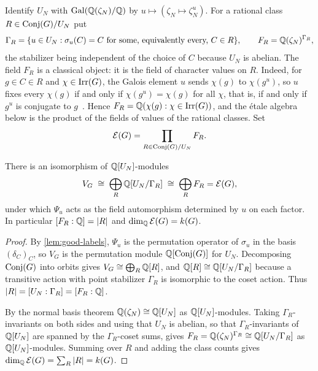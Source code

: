Identify \(U_N\) with \(\operatorname{Gal}(\mathbb Q(\zeta_N)/\mathbb Q)\) by
\(u\mapsto(\zeta_N\mapsto\zeta_N^u)\).  For a rational class
\(R\in\operatorname{Conj}(G)/U_N\) put
\[
 \Gamma_R=\{u\in U_N:\sigma_u(C)=C\ \text{for some, equivalently every, }C\in R\},
 \qquad
 F_R=\Q(\zeta_N)^{\Gamma_R},
\]
the stabilizer being independent of the choice of \(C\) because \(U_N\) is
abelian.  The field \(F_R\) is a classical object: it is the field of
character values on \(R\).  Indeed, for \(g\in C\in R\) and
\(\chi\in\operatorname{Irr}(G)\), the Galois element \(u\) sends \(\chi(g)\) to
\(\chi(g^u)\), so \(u\) fixes every \(\chi(g)\) if and only if
\(\chi(g^u)=\chi(g)\) for all \(\chi\), that is, if and only if
\(g^u\) is conjugate to \(g\)~\cite{Isaacs}.  Hence
\(F_R=\mathbb Q(\chi(g):\chi\in\operatorname{Irr}(G))\), and the étale algebra below is the
product of the fields of values of the rational classes.  Set
\begin{equation}
 \mathcal E(G)=\prod_{R\in\operatorname{Conj}(G)/U_N}F_R .
 \label{eq:etale-algebra}
\end{equation}

\begin{theorem}
\label{thm:rational-class-decomposition}
There is an isomorphism of \(\mathbb Q[U_N]\)-modules
\begin{equation}
 V_G\;\cong\;\bigoplus_R\mathbb Q[U_N/\Gamma_R]\;\cong\;\bigoplus_RF_R=\mathcal E(G),
 \label{eq:etale-decomposition}
\end{equation}
under which \(\Psi_u\) acts as the field automorphism determined by \(u\) on
each factor.  In particular \([F_R:\mathbb Q]=|R|\) and
\(\dim_\mathbb Q\mathcal E(G)=k(G)\).
\end{theorem}

\begin{proof}
By \cref{lem:good-labels}, \(\Psi_u\) is the permutation operator of
\(\sigma_u\) in the basis \((\delta_C)_C\), so \(V_G\) is the permutation
module \(\mathbb Q[\operatorname{Conj}(G)]\) for \(U_N\).  Decomposing \(\operatorname{Conj}(G)\) into orbits
gives \(V_G\cong\bigoplus_R\mathbb Q[R]\), and \(\mathbb Q[R]\cong\mathbb Q[U_N/\Gamma_R]\) because
a transitive action with point stabilizer \(\Gamma_R\) is isomorphic to the
coset action.  Thus \(|R|=[U_N:\Gamma_R]=[F_R:\mathbb Q]\).

By the normal basis theorem \(\mathbb Q(\zeta_N)\cong\mathbb Q[U_N]\) as
\(\mathbb Q[U_N]\)-modules.  Taking \(\Gamma_R\)-invariants on both sides and using
that \(U_N\) is abelian, so that \(\Gamma_R\)-invariants of \(\mathbb Q[U_N]\) are
spanned by the \(\Gamma_R\)-coset sums, gives
\(F_R=\mathbb Q(\zeta_N)^{\Gamma_R}\cong\mathbb Q[U_N/\Gamma_R]\) as \(\mathbb Q[U_N]\)-modules.
Summing over \(R\) and adding the class counts gives
\(\dim_\mathbb Q\mathcal E(G)=\sum_R|R|=k(G)\).
\end{proof}


